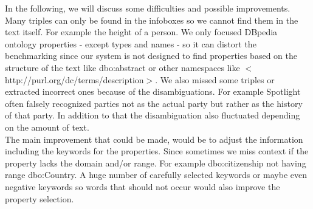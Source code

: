 \documentclass[runningheads]{llncs}
\begin{document}
In the following, we will discuss some difficulties and possible improvements. Many triples can only be found in the infoboxes so we cannot find them in the text itself. For example the height of a person. We only focused DBpedia ontology properties - except types and names - so it can distort the benchmarking since our system is not designed to find properties based on the structure of the text like dbo:abstract or other namespaces like $<$http://purl.org/dc/terms/description$>$. We also missed some triples or extracted incorrect ones because of the disambiguations. For example Spotlight often falsely recognized parties not as the actual party but rather as the history of that party. In addition to that the disambiguation also fluctuated depending on the amount of text.\\

The main improvement that could be made, would be to adjust the information including the keywords for the properties. Since sometimes we miss context if the property lacks the domain and/or range. For example dbo:citizenship not having range dbo:Country. A huge number of carefully selected keywords or maybe even negative keywords so words that should not occur would also improve the property selection. 

 
%
%



%
\end{document}
